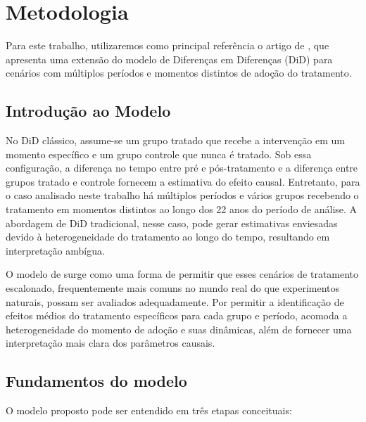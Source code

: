 \documentclass[
	12pt,				%
	oneside,			%
	a4paper,			%
	english,			%
	french,				%
	spanish,			%
	brazil				%
	]{abntex2}
\begin{document}
\chapter{Metodologia}

Para este trabalho, utilizaremos como principal referência o artigo de , que apresenta uma extensão do modelo de Diferenças em Diferenças (DiD) para cenários com múltiplos períodos e momentos distintos de adoção do tratamento.

\section{Introdução ao Modelo}

No DiD clássico, assume-se um grupo tratado que recebe a intervenção em um momento específico e um grupo controle que nunca é tratado. Sob essa configuração, a diferença no tempo entre pré e pós-tratamento e a diferença entre grupos tratado e controle fornecem a estimativa do efeito causal. Entretanto, para o caso analisado neste trabalho há múltiplos períodos e vários grupos recebendo o tratamento em momentos distintos ao longo dos 22 anos do período de análise. A abordagem de DiD tradicional, nesse caso, pode gerar estimativas enviesadas devido à heterogeneidade do tratamento ao longo do tempo, resultando em interpretação ambígua.

O modelo de  surge como uma forma de permitir que esses cenários de tratamento escalonado, frequentemente mais comuns no mundo real do que experimentos naturais, possam ser avaliados adequadamente. Por permitir a identificação de efeitos médios do tratamento específicos para cada grupo e período, acomoda a heterogeneidade do momento de adoção e suas dinâmicas, além de fornecer uma interpretação mais clara dos parâmetros causais.

\section{Fundamentos do modelo}

O modelo proposto pode ser entendido em três etapas conceituais:
\end{document}
